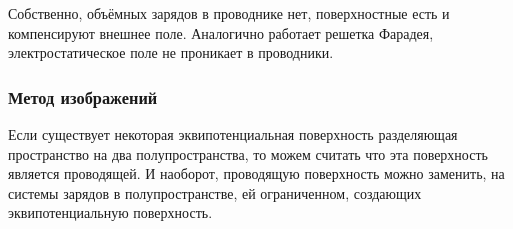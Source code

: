 Собственно, объёмных зарядов в проводнике нет, поверхностные есть и компенсируют внешнее поле. Аналогично работает решетка Фарадея, электростатическое поле не проникает в проводники.


\subsubsection*{Метод изображений}

Если существует некоторая эквипотенциальная поверхность разделяющая пространство на два полупространства, то можем считать что эта поверхность является проводящей. И наоборот, проводящую поверхность можно заменить, на системы зарядов в полупространстве, ей ограниченном, создающих эквипотенциальную поверхность.

